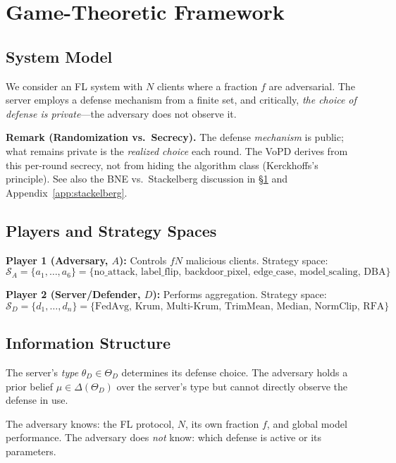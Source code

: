 \documentclass{article}
\newcommand{\SA}{\mathcal{S}_A}
\newcommand{\SD}{\mathcal{S}_D}
\newcommand{\thetaD}{\theta_D}
\newcommand{\ThetaD}{\Theta_D}
\begin{document}
\section{Game-Theoretic Framework}
\label{sec:framework}

\subsection{System Model}

We consider an FL system with $N$ clients where a fraction $f$ are adversarial. The server employs a defense mechanism from a finite set, and critically, \emph{the choice of defense is private}---the adversary does not observe it.

\textbf{Remark (Randomization vs.\ Secrecy).} The defense \emph{mechanism} is public; what remains private is the \emph{realized choice} each round. The VoPD derives from this per-round secrecy, not from hiding the algorithm class (Kerckhoffs's principle). See also the BNE vs.\ Stackelberg discussion in §\ref{sec:framework} and Appendix~\ref{app:stackelberg}.

\subsection{Players and Strategy Spaces}

\textbf{Player 1 (Adversary, $A$):} Controls $fN$ malicious clients. Strategy space:
\begin{equation}
    \SA = \{a_1, \ldots, a_6\} = \{\text{no\_attack, label\_flip, backdoor\_pixel, edge\_case, model\_scaling, DBA}\}
\end{equation}

\textbf{Player 2 (Server/Defender, $D$):} Performs aggregation. Strategy space:
\begin{equation}
    \SD = \{d_1, \ldots, d_n\} = \{\text{FedAvg, Krum, Multi-Krum, TrimMean, Median, NormClip, RFA}\}
\end{equation}

\subsection{Information Structure}

The server's \emph{type} $\thetaD \in \ThetaD$ determines its defense choice. The adversary holds a prior belief $\mu \in \Delta(\ThetaD)$ over the server's type but cannot directly observe the defense in use.

The adversary knows: the FL protocol, $N$, its own fraction $f$, and global model performance. The adversary does \emph{not} know: which defense is active or its parameters.
\end{document}
